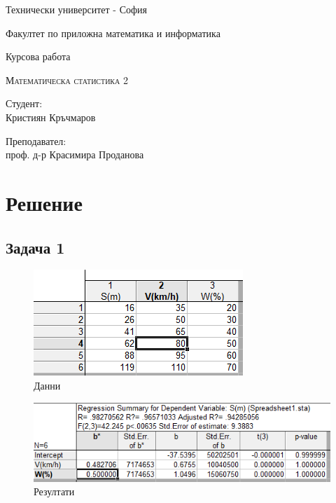\documentclass[a4paper,fleqn,12pt]{article}
\begin{document}
\begin{titlepage}
	\setlength{\parindent}{0pt}
	\large
\centering
Технически университет -  София \par
Факултет по приложна математика и информатика \par
\vspace{2cm}

{\huge Курсова работа \par}

\vspace{2cm}

\vspace{1cm}
{\LARGE\scshape Математическа статистика 2 \par}



\vfill

\begin{minipage}[t]{.5\linewidth}
	Студент: \\
	Кристиян Кръчмаров
\end{minipage}%
\begin{minipage}[t]{.5\linewidth}
	\raggedleft
	Преподавател:\\
	проф. д-р Красимира Проданова
\end{minipage}

\vspace{2cm}
\raggedright

\end{titlepage}
\tableofcontents
\newpage


\newpage
{}
\section{Решение}
\subsection{Задача 1}

\begin{figure}[h]
  \centering
  \includegraphics{task1-data.png}
  \caption{Данни}
\end{figure}
\begin{figure}[h]
  \centering
  \includegraphics{task1-1.png}
  \caption{Резултати}
\end{figure}
\end{document}
